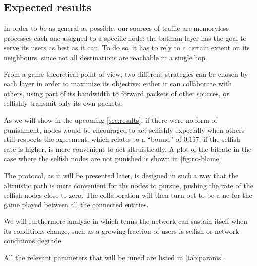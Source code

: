 \documentclass[conference]{IEEEtran}
\begin{document}
\subsection{Expected results}

In order to be as general as possible, our sources of traffic are memoryless processes each one assigned to a specific node: the \gls{batman} layer has the goal to serve its users as best as it can. To do so, it has to rely to a certain extent on its neighbours, since not all destinations are reachable in a single hop.

%

From a game theoretical point of view, two different strategies can be chosen by each layer in order to maximize its objective: either it can collaborate with others, using part of its bandwidth to forward packets of other sources, or selfishly transmit only its own packets.

As we will show in the upcoming \autoref{sec:results}, if there were no form of punishment, nodes would be encouraged to act selfishly expecially when others still respects the agreement, which relates to a ``bound'' of $0.167$: if the selfish rate is higher, is more convenient to act altruistically.
A plot of the bitrate in the case where the selfish nodes are not punished is shown in \ref{fig:no-blame}



The protocol, as it will be presented later, is designed in such a way that the altruistic path is more convenient for the nodes to pursue, pushing the rate of the selfish nodes close to zero. The collaboration will then turn out to be a \gls{ne} for the game played between all the connected entities.

We will furthermore analyze in which terms the network can sustain itself when its conditions change, such as a growing fraction of users is selfish or network conditions degrade.

All the relevant parameters that will be tuned are listed in \autoref{tab:params}.

\renewcommand\theadalign{l}
\end{document}
